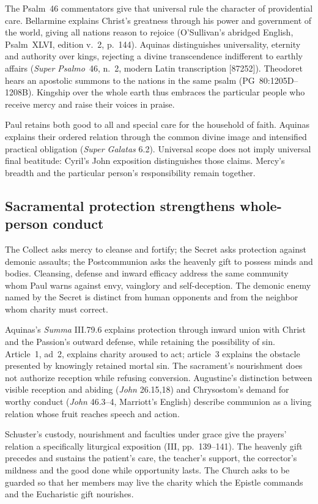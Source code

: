 The Psalm~46 commentators give that universal rule the character of
providential care. Bellarmine explains Christ's greatness through his
power and government of the world, giving all nations reason to rejoice
(O'Sullivan's abridged English, Psalm~XLVI, edition v.~2, p.~144).
Aquinas distinguishes universality, eternity and authority over kings,
rejecting a divine transcendence indifferent to earthly affairs
(\emph{Super Psalmo}~46, n.~2, modern Latin transcription [87252]).
Theodoret hears an apostolic summons to the nations in the same psalm
(PG~80:1205D--1208B). Kingship over the whole earth thus embraces the
particular people who receive mercy and raise their voices in praise.

Paul retains both good to all and special care for the household of faith.
Aquinas explains their ordered relation through the common divine image
and intensified practical obligation (\emph{Super Galatas} 6.2).
Universal scope does not imply universal final beatitude: Cyril's John
exposition distinguishes those claims. Mercy's breadth and the particular
person's responsibility remain together.

\subsection*{Sacramental protection strengthens whole-person conduct\enspace{}}

The Collect asks mercy to cleanse and fortify; the Secret asks protection
against demonic assaults; the Postcommunion asks the heavenly gift to
possess minds and bodies. Cleansing, defense and inward efficacy address
the same community whom Paul warns against envy, vainglory and
self-deception. The demonic enemy named by the Secret is distinct from
human opponents and from the neighbor whom charity must correct.

Aquinas's \emph{Summa} III.79.6 explains protection through inward union
with Christ and the Passion's outward defense, while retaining the
possibility of sin. Article~1, ad~2, explains charity aroused to act;
article~3 explains the obstacle presented by knowingly retained mortal sin.
The sacrament's nourishment does not authorize reception while refusing
conversion. Augustine's distinction between visible reception and abiding
(\emph{John} 26.15,18) and Chrysostom's demand for worthy conduct
(\emph{John} 46.3--4, Marriott's English) describe communion as a
living relation whose fruit reaches speech and action.

Schuster's custody, nourishment and faculties under grace give the prayers'
relation a specifically liturgical exposition (III, pp.~139--141).
The heavenly gift precedes and sustains the patient's care, the teacher's
support, the corrector's mildness and the good done while opportunity lasts.
The Church asks to be guarded so that her members may live the charity
which the Epistle commands and the Eucharistic gift nourishes.
